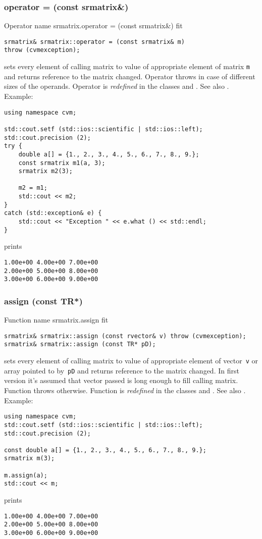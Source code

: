 \subsubsection{operator = (const srmatrix\&)}
Operator%
\pdfdest name {srmatrix.operator = (const srmatrix&)} fit
\begin{verbatim}
srmatrix& srmatrix::operator = (const srmatrix& m)
throw (cvmexception);
\end{verbatim}
sets  every element of  calling matrix to  value of
appropriate element of  matrix \verb"m"
and returns  reference to
the matrix changed.
Operator throws  
in case of different sizes of the operands.
Operator is \emph{redefined} in the classes
and .
See also .
Example:
\begin{Verbatim}
using namespace cvm;

std::cout.setf (std::ios::scientific | std::ios::left); 
std::cout.precision (2);
try {
    double a[] = {1., 2., 3., 4., 5., 6., 7., 8., 9.};
    const srmatrix m1(a, 3);
    srmatrix m2(3);

    m2 = m1;
    std::cout << m2;
}
catch (std::exception& e) {
    std::cout << "Exception " << e.what () << std::endl;
}
\end{Verbatim}
prints
\begin{Verbatim}
1.00e+00 4.00e+00 7.00e+00
2.00e+00 5.00e+00 8.00e+00
3.00e+00 6.00e+00 9.00e+00
\end{Verbatim}
\newpage



\subsubsection{assign (const TR*)}
Function%
\pdfdest name {srmatrix.assign} fit
\begin{verbatim}
srmatrix& srmatrix::assign (const rvector& v) throw (cvmexception);
srmatrix& srmatrix::assign (const TR* pD);
\end{verbatim}
sets every element of  calling matrix to  value of
appropriate element of  vector~\verb'v'
or  array pointed to by~\verb"pD"
and returns  reference to
the matrix changed.
In first version it's assumed that vector passed is long
enough to fill calling matrix. Function throws  
otherwise.
Function is \emph{redefined} in the classes
and .
See also .
Example:
\begin{Verbatim}
using namespace cvm;
std::cout.setf (std::ios::scientific | std::ios::left); 
std::cout.precision (2);

const double a[] = {1., 2., 3., 4., 5., 6., 7., 8., 9.};
srmatrix m(3);

m.assign(a);
std::cout << m;
\end{Verbatim}
prints
\begin{Verbatim}
1.00e+00 4.00e+00 7.00e+00
2.00e+00 5.00e+00 8.00e+00
3.00e+00 6.00e+00 9.00e+00
\end{Verbatim}
\newpage





